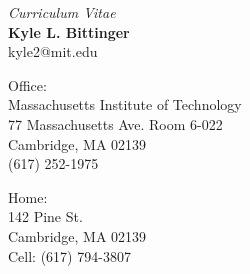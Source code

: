 \documentclass[12pt, letter]{article}
\newcommand{\hellomynameis}[1]{{\large \textbf{#1}}}
\begin{document}
\thispagestyle{plain}

\begin{center}
\emph{Curriculum Vitae}\\[1mm]
\hellomynameis{Kyle L. Bittinger}\\[1mm]
kyle2@mit.edu
\end{center}

\begin{multicols}{2}
  Office: \\
  Massachusetts Institute of Technology \\
  77 Massachusetts Ave. Room 6-022 \\
  Cambridge, MA 02139 \\
  (617) 252-1975

  Home: \\
  142 Pine St. \\
  Cambridge, MA 02139 \\
  Cell: (617) 794-3807
\end{multicols}
\end{document}

